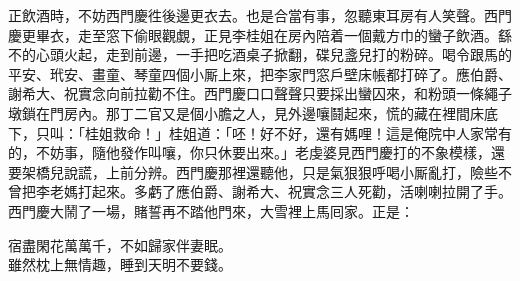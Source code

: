 正飲酒時，不妨西門慶徃後邊更衣去。也是合當有事，忽聽東耳房有人笑聲。西門慶更畢衣，走至窓下偷眼觀覷，正見李桂姐在房內陪着一個戴方巾的蠻子飲酒。{}繇不的心頭火起，走到前邊，一手把吃酒桌子掀翻，碟兒盞兒打的粉碎。喝令跟馬的平安、玳安、畫童、琴童四個小厮上來，把李家門窓戶壁床帳都打碎了。應伯爵、謝希大、祝實念向前拉勸不住。西門慶口口聲聲只要採出蠻囚來，和粉頭一條繩子墩鎖在門房內。那丁二官又是個小膽之人，見外邊嚷鬪起來，慌的藏在裡間床底下，只叫：「桂姐救命！」桂姐道：「呸！好不好，還有媽哩！這是俺院中人家常有的，不妨事，隨他發作叫嚷，你只休要出來。」老虔婆見西門慶打的不象模樣，還要架橋兒說謊，上前分辨。西門慶那裡還聽他，只是氣狠狠呼喝小厮亂打，險些不曾把李老媽打起來。多虧了應伯爵、謝希大、祝實念三人死勸，活喇喇拉開了手。西門慶大鬧了一場，賭誓再不踏他門來，大雪裡上馬囘家。正是：

\begin{myquote} 
宿盡閑花萬萬千，不如歸家伴妻眠。\\雖然枕上無情趣，睡到天明不要錢。
\end{myquote} 

